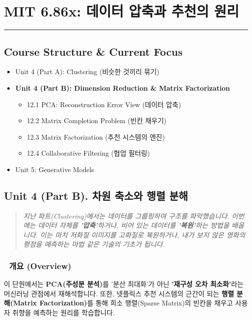 \documentclass[11pt,a4paper]{book}
\theoremstyle{definition}
\begin{document}
\chapter{MIT 6.86x: 데이터 압축과 추천의 원리}
\label{ch:lecture12}


\vspace{1cm}
\hrule
\vspace{1cm}

\section*{Course Structure \& Current Focus}
\begin{itemize}
    \item Unit 4 (Part A): Clustering (비슷한 것끼리 묶기)
    \item \textbf{\textcolor{mainblue}{Unit 4 (Part B): Dimension Reduction \& Matrix Factorization}}
    \begin{itemize}
        \item 12.1 PCA: Reconstruction Error View (데이터 압축)
        \item 12.2 Matrix Completion Problem (빈칸 채우기)
        \item 12.3 Matrix Factorization (추천 시스템의 엔진)
        \item 12.4 Collaborative Filtering (협업 필터링)
    \end{itemize}
    \item Unit 5: Generative Models
\end{itemize}


\section{Unit 4 (Part B). 차원 축소와 행렬 분해}

\begin{quote}
\textit{지난 파트(Clustering)에서는 데이터를 그룹핑하여 구조를 파악했습니다. 이번에는 데이터 자체를 \textbf{'압축'}하거나, 비어 있는 데이터를 \textbf{'복원'}하는 방법을 배웁니다. 이는 마치 저화질 이미지를 고화질로 복원하거나, 내가 보지 않은 영화의 평점을 예측하는 마법 같은 기술의 기초가 됩니다.}
\end{quote}

\subsection*{📌 개요 (Overview)}
이 단원에서는 \textbf{PCA(주성분 분석)}를 '분산 최대화'가 아닌 \textbf{'재구성 오차 최소화'}라는 머신러닝 관점에서 재해석합니다. 또한, 넷플릭스 추천 시스템의 근간이 되는 \textbf{행렬 분해(Matrix Factorization)}를 통해 희소 행렬(Sparse Matrix)의 빈칸을 채우고 사용자 취향을 예측하는 원리를 학습합니다.
\end{document}
